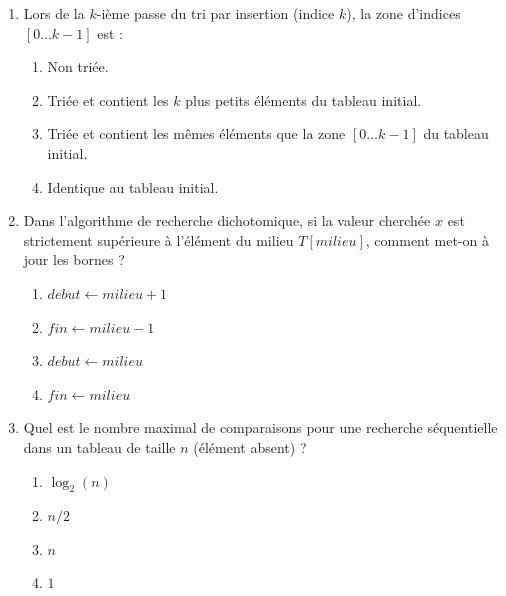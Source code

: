 \documentclass[11pt]{article}
\begin{document}
\begin{exercice}
\begin{enumerate}
    \item Lors de la $k$-ième passe du tri par insertion (indice $k$), la zone d'indices $[0 \dots k-1]$ est :
    \begin{enumerate}
        \item Non triée.
        \item Triée et contient les $k$ plus petits éléments du tableau initial.
        \item Triée et contient les mêmes éléments que la zone $[0 \dots k-1]$ du tableau initial.
        \item Identique au tableau initial.
    \end{enumerate}
    \item Dans l'algorithme de recherche dichotomique, si la valeur cherchée $x$ est strictement supérieure à l'élément du milieu $T[milieu]$, comment met-on à jour les bornes ?
    \begin{enumerate}
        \item $debut \leftarrow milieu + 1$
        \item $fin \leftarrow milieu - 1$
        \item $debut \leftarrow milieu$
        \item $fin \leftarrow milieu$
    \end{enumerate}
    \item Quel est le nombre maximal de comparaisons pour une recherche séquentielle dans un tableau de taille $n$ (élément absent) ?
    \begin{enumerate}
        \item $\log_2(n)$
        \item $n/2$
        \item $n$
        \item $1$
    \end{enumerate}
\end{enumerate}
\end{exercice}
\end{document}
